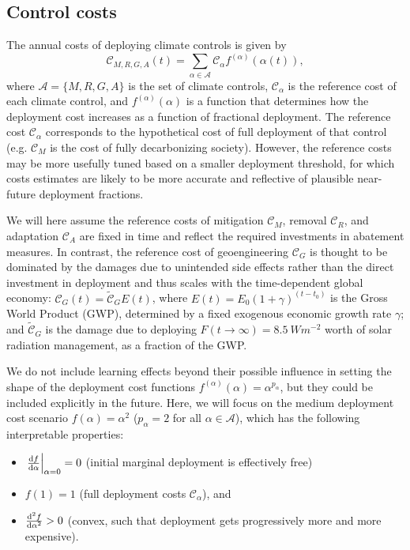 \documentclass{article}
\begin{document}
\subsection{Control costs}

The annual costs of deploying climate controls is given by
\begin{equation}
    \mathcal{C}_{M, R, G, A}(t) = \sum_{\alpha \in \mathcal{A}} \mathcal{C}_{\alpha} f^{(\alpha)}(\alpha(t)),
\end{equation}
where $\mathcal{A} = \{M, R, G, A \}$ is the set of climate controls, $\mathcal{C}_{\alpha}$ is the reference cost of each climate control, and $f^{(\alpha)}(\alpha)$ is a function that determines how the deployment cost increases as a function of fractional deployment. The reference cost $\mathcal{C}_{\alpha}$ corresponds to the hypothetical cost of full deployment of that control (e.g. $\mathcal{C}_{M}$ is the cost of fully decarbonizing society). However, the reference costs may be more usefully tuned based on a smaller deployment threshold, for which costs estimates are likely to be more accurate and reflective of plausible near-future deployment fractions.

We will here assume the reference costs of mitigation $\mathcal{C}_{M}$, removal $\mathcal{C}_{R}$, and adaptation $\mathcal{C}_{A}$ are fixed in time and reflect the required investments in abatement measures. In contrast, the reference cost of geoengineering $\mathcal{C}_{G}$ is thought to be dominated by the damages due to unintended side effects rather than the direct investment in deployment and thus scales with the time-dependent global economy: $\mathcal{C}_{G}(t) = \tilde{\mathcal{C}}_{G} E(t)$, where $E(t) = E_{0}(1 + \gamma)^{(t-t_{0})}$ is the Gross World Product (GWP), determined by a fixed exogenous economic growth rate $\gamma$; and  $\tilde{\mathcal{C}}_{G}$ is the damage due to deploying $F(t \rightarrow \infty) = \SI{8.5}{W m^{-2}}$ worth of solar radiation management, as a fraction of the GWP.

We do not include learning effects beyond their possible influence in setting the shape of the deployment cost functions $f^{(\alpha)}(\alpha) = \alpha^{p_{\alpha}}$, but they could be included explicitly in the future. Here, we will focus on the medium deployment cost scenario $f(\alpha) = \alpha^{2}$ ($p_{\alpha} = 2$ for all $\alpha \in \mathcal{A}$), which has the following interpretable properties: 
\begin{itemize}
    \item $\left. \dv{f}{\alpha}\right|_{\alpha=0} = 0$ (initial marginal deployment is effectively free)
    \item $f(1) = 1$ (full deployment costs $\mathcal{C}_{\alpha}$), and
    \item $\dv[2]{f}{\alpha} > 0$ (convex, such that deployment gets progressively more and more expensive).
\end{itemize}
\end{document}
